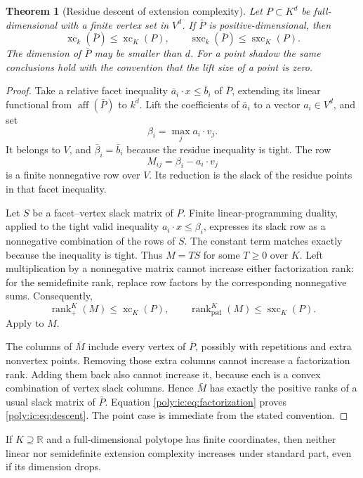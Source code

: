 \documentclass[11pt,a4paper]{article}
\numberwithin{equation}{section}
\newtheorem{theorem}{Theorem}[section]
\theoremstyle{plain}
\newcommand{\R}{\mathbb R}
\newcommand{\aff}{\operatorname{aff}}
\newcommand{\xc}{\operatorname{xc}}
\newcommand{\sx}{\operatorname{sxc}}
\newcommand{\rankp}{\operatorname{rank}_{+}}
\newcommand{\rankpsd}{\operatorname{rank}_{\mathrm{psd}}}
\begin{document}
\begin{theorem}[Residue descent of extension complexity]\label{poly:ic:thm:shadowdescent}
Let $P\subset K^d$ be full-dimensional with a finite vertex set in $V^d$.
If $\bar P$ is positive-dimensional, then
\begin{equation}\label{poly:ic:eq:descent}
 \xc_k(\bar P)\leq\xc_K(P),\qquad
 \sx_k(\bar P)\leq\sx_K(P).
\end{equation}
The dimension of $\bar P$ may be smaller than $d$. For a point shadow the
same conclusions hold with the convention that the lift size of a point
is zero.
\end{theorem}
\begin{proof}
Take a relative facet inequality $\bar a_i\cdot x\leq\bar b_i$ of
$\bar P$, extending its linear functional from $\aff(\bar P)$ to $k^d$.
Lift the coefficients of $\bar a_i$ to a vector $a_i\in V^d$, and set
\[
 \beta_i=\max_j a_i\cdot v_j.
\]
It belongs to $V$, and $\bar\beta_i=\bar b_i$ because the residue
inequality is tight. The row
\[
 M_{ij}=\beta_i-a_i\cdot v_j
\]
is a finite nonnegative row over $V$. Its reduction is the slack of the
residue points in that facet inequality.

Let $S$ be a facet--vertex slack matrix of $P$. Finite linear-programming
duality, applied to the tight valid inequality
$a_i\cdot x\leq\beta_i$, expresses its slack row as a nonnegative
combination of the rows of $S$. The constant term matches exactly because
the inequality is tight. Thus $M=TS$ for some $T\geq0$ over $K$.
Left multiplication by a nonnegative matrix cannot increase either
factorization rank: for the semidefinite rank, replace row factors by
the corresponding nonnegative sums. Consequently,
\[
 \rankp^K(M)\leq\xc_K(P),\qquad
 \rankpsd^K(M)\leq\sx_K(P).
\]
Apply  to $M$.

The columns of $\bar M$ include every vertex of $\bar P$, possibly with
repetitions and extra nonvertex points. Removing those extra columns
cannot increase a factorization rank. Adding them back also cannot
increase it, because each is a convex combination of vertex slack
columns. Hence $\bar M$ has exactly the positive ranks of a usual slack
matrix of $\bar P$. Equation \eqref{poly:ic:eq:factorization} proves
\eqref{poly:ic:eq:descent}. The point case is immediate from the stated convention.
\end{proof}

\begin{corollary}\label{poly:ic:cor:realshadow}
If $K\supseteq\R$ and a full-dimensional polytope has finite coordinates,
then neither linear nor semidefinite extension complexity increases under
standard part, even if its dimension drops.
\end{corollary}
\end{document}
